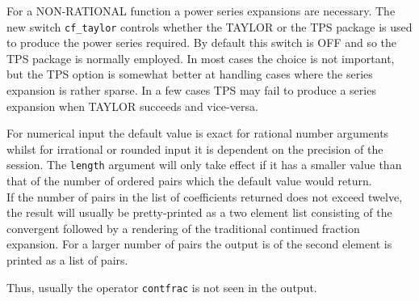 \hypertarget{CF_TAYLOR:switch}{}

For a NON-RATIONAL function a power series expansions are necessary. The new
switch \texttt{cf\_taylor} controls whether the TAYLOR or the TPS package is 
used to produce the power series required. By default this switch is OFF and
so the TPS package is normally employed.
In most cases the choice is not important, but the TPS option is somewhat better
at handling cases where the series expansion is rather sparse. In a few cases
TPS may fail to produce a series expansion when TAYLOR succeeds and vice-versa.

For numerical input the default value is exact for
rational number arguments whilst for irrational or rounded input it is
dependent on the precision of the session. The
\texttt{length} argument will only take effect if it has a smaller
value than that of the number of ordered pairs which the default
value would return.\\[\baselineskip]

If the number of pairs in the list of coefficients returned does not exceed
twelve, the result will usually be pretty-printed as a two element list
consisting of the convergent followed by a rendering of the traditional
continued fraction expansion. For a larger number of pairs the output is
of the second element is printed as a list of pairs.

Thus, usually the operator \texttt{contfrac} is not seen in the output.

